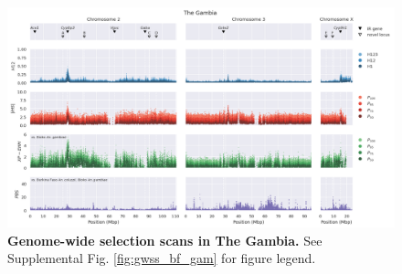 \documentclass[a4paper,11pt,abstracton,hidelinks]{scrartcl}
\begin{document}
\begin{landscape}
\begin{figure}[t!]
	\begin{center}
		\includegraphics*[width=1.05\linewidth,center]{artwork/gwss_gm_gq_gam_bf_col_gq_gam.png}
	\end{center}
	\caption[Genome-wide selection scans in The Gambia]{
	\textbf{Genome-wide selection scans in The Gambia.} 
	See Supplemental Fig. \ref{fig:gwss_bf_gam} for figure legend.
	} 
	\label{fig:gwss_gm}
\end{figure}


\end{landscape}


\clearpage
\end{document}
